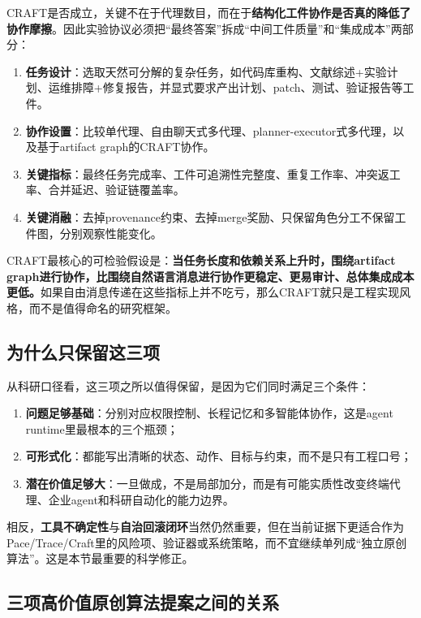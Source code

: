 \documentclass[12pt,a4paper]{article}
\begin{document}
CRAFT是否成立，关键不在于代理数目，而在于\textbf{结构化工件协作是否真的降低了协作摩擦}。因此实验协议必须把“最终答案”拆成“中间工件质量”和“集成成本”两部分：

\begin{enumerate}
    \item \textbf{任务设计}：选取天然可分解的复杂任务，如代码库重构、文献综述+实验计划、运维排障+修复报告，并显式要求产出计划、patch、测试、验证报告等工件。
    \item \textbf{协作设置}：比较单代理、自由聊天式多代理、planner-executor式多代理，以及基于artifact graph的CRAFT协作。
    \item \textbf{关键指标}：最终任务完成率、工件可追溯性完整度、重复工作率、冲突返工率、合并延迟、验证链覆盖率。
    \item \textbf{关键消融}：去掉provenance约束、去掉merge奖励、只保留角色分工不保留工件图，分别观察性能变化。
\end{enumerate}

CRAFT最核心的可检验假设是：\textbf{当任务长度和依赖关系上升时，围绕artifact graph进行协作，比围绕自然语言消息进行协作更稳定、更易审计、总体集成成本更低。}如果自由消息传递在这些指标上并不吃亏，那么CRAFT就只是工程实现风格，而不是值得命名的研究框架。

\subsection{为什么只保留这三项}

从科研口径看，这三项之所以值得保留，是因为它们同时满足三个条件：

\begin{enumerate}
    \item \textbf{问题足够基础}：分别对应权限控制、长程记忆和多智能体协作，这是agent runtime里最根本的三个瓶颈；
    \item \textbf{可形式化}：都能写出清晰的状态、动作、目标与约束，而不是只有工程口号；
    \item \textbf{潜在价值足够大}：一旦做成，不是局部加分，而是有可能实质性改变终端代理、企业agent和科研自动化的能力边界。
\end{enumerate}

相反，\textbf{工具不确定性}与\textbf{自治回滚闭环}当然仍然重要，但在当前证据下更适合作为Pace/Trace/Craft里的风险项、验证器或系统策略，而不宜继续单列成“独立原创算法”。这是本节最重要的科学修正。

\subsection{三项高价值原创算法提案之间的关系}
\end{document}
